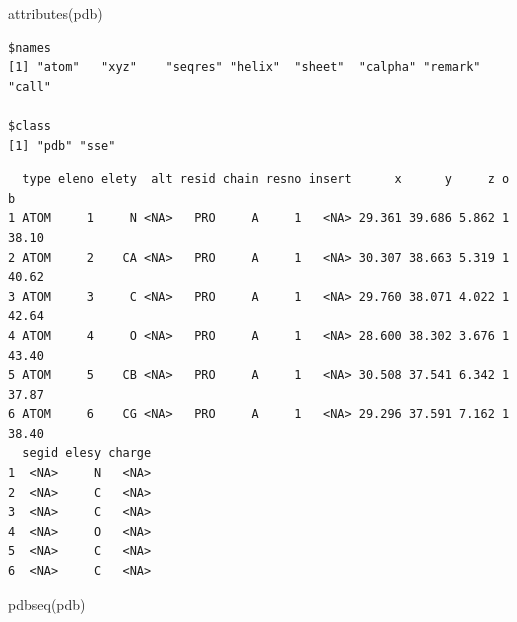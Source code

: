 \documentclass[
  letterpaper,
  DIV=11,
  numbers=noendperiod]{scrartcl}
\newenvironment{Shaded}{\begin{snugshade}}{\end{snugshade}}
\newcommand{\FunctionTok}[1]{\textcolor[rgb]{0.28,0.35,0.67}{#1}}
\newcommand{\NormalTok}[1]{\textcolor[rgb]{0.00,0.23,0.31}{#1}}
\newcommand{\SpecialCharTok}[1]{\textcolor[rgb]{0.37,0.37,0.37}{#1}}
\begin{document}
\begin{Shaded}
\begin{Highlighting}[]
\FunctionTok{attributes}\NormalTok{(pdb)}
\end{Highlighting}
\end{Shaded}

\begin{verbatim}
$names
[1] "atom"   "xyz"    "seqres" "helix"  "sheet"  "calpha" "remark" "call"  

$class
[1] "pdb" "sse"
\end{verbatim}

\begin{Shaded}
\end{Shaded}

\begin{verbatim}
  type eleno elety  alt resid chain resno insert      x      y     z o     b
1 ATOM     1     N <NA>   PRO     A     1   <NA> 29.361 39.686 5.862 1 38.10
2 ATOM     2    CA <NA>   PRO     A     1   <NA> 30.307 38.663 5.319 1 40.62
3 ATOM     3     C <NA>   PRO     A     1   <NA> 29.760 38.071 4.022 1 42.64
4 ATOM     4     O <NA>   PRO     A     1   <NA> 28.600 38.302 3.676 1 43.40
5 ATOM     5    CB <NA>   PRO     A     1   <NA> 30.508 37.541 6.342 1 37.87
6 ATOM     6    CG <NA>   PRO     A     1   <NA> 29.296 37.591 7.162 1 38.40
  segid elesy charge
1  <NA>     N   <NA>
2  <NA>     C   <NA>
3  <NA>     C   <NA>
4  <NA>     O   <NA>
5  <NA>     C   <NA>
6  <NA>     C   <NA>
\end{verbatim}

\begin{Shaded}
\begin{Highlighting}[]
\FunctionTok{pdbseq}\NormalTok{(pdb)}
\end{Highlighting}
\end{Shaded}
\end{document}
